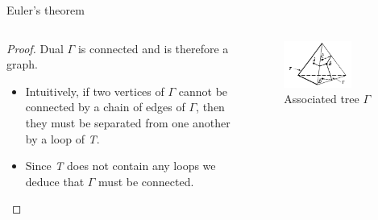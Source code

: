 \documentclass{beamer}
\begin{document}
\begin{frame}{Euler's theorem}
\begin{columns}
\begin{column}{0.6\textwidth}
  \begin{proof}
    Dual $\Gamma$ is connected and is therefore a graph.
    \begin{itemize}
    \item Intuitively, if two vertices of $\Gamma$ cannot be connected by a chain of edges of $\Gamma$, then they must be separated from one another by a loop of \textsl{T}.
    \item Since \textsl{T} does not contain any loops we deduce that $\Gamma$ must be connected.
    \end{itemize}
  \end{proof}
\end{column}
\begin{column}{0.4\textwidth}
    \begin{figure}
    \centering
        \includegraphics[width=0.7\textwidth]{figure_1_5_c.png}
        \caption{Associated tree $\Gamma$}
    \end{figure}
\end{column}
\end{columns}
\end{frame}
\end{document}
